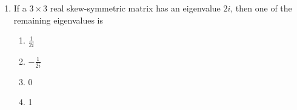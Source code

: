 \documentclass[journal]{IEEEtran}
\numberwithin{equation}{enumi}
\numberwithin{figure}{enumi}
\begin{document}
\begin{enumerate}
    \item If a $3 \times 3$ real skew-symmetric matrix has an eigenvalue $2i$, then one of the remaining eigenvalues is
    \begin{multicols}{4}
    \begin{enumerate}
        \item $\frac{1}{2i}$
        \item $-\frac{1}{2i}$
        \item 0
        \item 1
    \end{enumerate}
    \end{multicols}
    
\end{enumerate}
\end{document}
